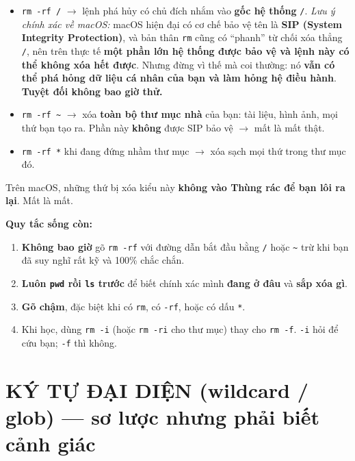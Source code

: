 \documentclass[12pt,a4paper]{article}
\newcommand{\cmd}[1]{\texttt{#1}}
\begin{document}
\begin{dangerbox}[title={TUYỆT ĐỐI GHI NHỚ --- những lệnh KHÔNG BAO GIỜ được gõ liều}]
\begin{itemize}[leftmargin=1.4em]
\item \cmd{rm -rf /} $\rightarrow$ lệnh phá hủy có chủ đích nhắm vào \textbf{gốc hệ thống} \cmd{/}. \textit{Lưu ý chính xác về macOS:} macOS hiện đại có cơ chế bảo vệ tên là \textbf{SIP (System Integrity Protection)}, và bản thân \cmd{rm} cũng có ``phanh'' từ chối xóa thẳng \cmd{/}, nên trên thực tế \textbf{một phần lớn hệ thống được bảo vệ và lệnh này có thể không xóa hết được}. Nhưng đừng vì thế mà coi thường: nó \textbf{vẫn có thể phá hỏng dữ liệu cá nhân của bạn và làm hỏng hệ điều hành}. \textbf{Tuyệt đối không bao giờ thử.}
\item \cmd{rm -rf \textasciitilde{}} $\rightarrow$ xóa \textbf{toàn bộ thư mục nhà} của bạn: tài liệu, hình ảnh, mọi thứ bạn tạo ra. Phần này \textbf{không} được SIP bảo vệ $\rightarrow$ mất là mất thật.
\item \cmd{rm -rf *} khi đang đứng nhầm thư mục $\rightarrow$ xóa sạch mọi thứ trong thư mục đó.
\end{itemize}

Trên macOS, những thứ bị xóa kiểu này \textbf{không vào Thùng rác để bạn lôi ra lại}. Mất là mất.
\end{dangerbox}

\textbf{Quy tắc sống còn:}
\begin{enumerate}[leftmargin=2em]
\item \textbf{Không bao giờ} gõ \cmd{rm -rf} với đường dẫn bắt đầu bằng \cmd{/} hoặc \cmd{\textasciitilde{}} trừ khi bạn đã suy nghĩ rất kỹ và 100\% chắc chắn.
\item \textbf{Luôn \cmd{pwd} rồi \cmd{ls} trước} để biết chính xác mình \textbf{đang ở đâu} và \textbf{sắp xóa gì}.
\item \textbf{Gõ chậm}, đặc biệt khi có \cmd{rm}, có \cmd{-rf}, hoặc có dấu \cmd{*}.
\item Khi học, dùng \cmd{rm -i} (hoặc \cmd{rm -ri} cho thư mục) thay cho \cmd{rm -f}. \cmd{-i} hỏi để cứu bạn; \cmd{-f} thì không.
\end{enumerate}

\section{KÝ TỰ ĐẠI DIỆN (wildcard / glob) --- sơ lược nhưng phải biết cảnh giác}
\end{document}
